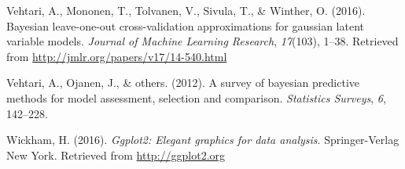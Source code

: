 \documentclass[english,,doc,floatsintext]{apa6}
\theoremstyle{definition}
\theoremstyle{definition}
\theoremstyle{definition}
\theoremstyle{remark}
\begin{document}
\leavevmode\hypertarget{ref-vehtari2016}{}%
Vehtari, A., Mononen, T., Tolvanen, V., Sivula, T., \& Winther, O.
(2016). Bayesian leave-one-out cross-validation approximations for
gaussian latent variable models. \emph{Journal of Machine Learning
Research}, \emph{17}(103), 1--38. Retrieved from
\url{http://jmlr.org/papers/v17/14-540.html}

\leavevmode\hypertarget{ref-vehtari2012}{}%
Vehtari, A., Ojanen, J., \& others. (2012). A survey of bayesian
predictive methods for model assessment, selection and comparison.
\emph{Statistics Surveys}, \emph{6}, 142--228.

\leavevmode\hypertarget{ref-ggplot2}{}%
Wickham, H. (2016). \emph{Ggplot2: Elegant graphics for data analysis}.
Springer-Verlag New York. Retrieved from \url{http://ggplot2.org}
\end{document}
